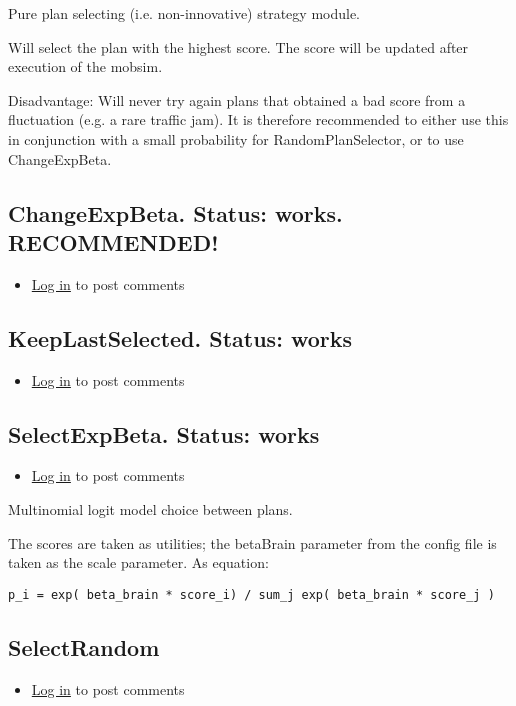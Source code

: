 \documentclass[a4paper,11pt]{report}
\begin{document}
Pure plan selecting (i.e. non-innovative) strategy module.

Will select the plan with the highest score. The score will be updated after execution of the mobsim.

Disadvantage: Will never try again plans that obtained a bad score  from a fluctuation (e.g. a rare traffic jam). It is therefore  recommended to either use this in conjunction with a small probability  for RandomPlanSelector, or to use ChangeExpBeta.

\subsection{ChangeExpBeta. Status: works. RECOMMENDED!}
\begin{itemize}
	\item \href{http://www.matsim.org/user/login?destination=comment/reply/700%23comment-form}{Log in} to post comments
\end{itemize}

\subsection{KeepLastSelected. Status: works}
\begin{itemize}
	\item \href{http://www.matsim.org/user/login?destination=comment/reply/702%23comment-form}{Log in} to post comments
\end{itemize}

\subsection{SelectExpBeta. Status: works}
\begin{itemize}
	\item \href{http://www.matsim.org/user/login?destination=comment/reply/699%23comment-form}{Log in} to post comments
\end{itemize}

Multinomial logit model choice between plans.

The scores are taken as utilities; the betaBrain parameter from the  config file is taken as the scale parameter. As equation:
\begin{verbatim}
p_i = exp( beta_brain * score_i) / sum_j exp( beta_brain * score_j )
\end{verbatim}

\subsection{SelectRandom}
\begin{itemize}
	\item \href{http://www.matsim.org/user/login?destination=comment/reply/701%23comment-form}{Log in} to post comments
\end{itemize}
\end{document}
